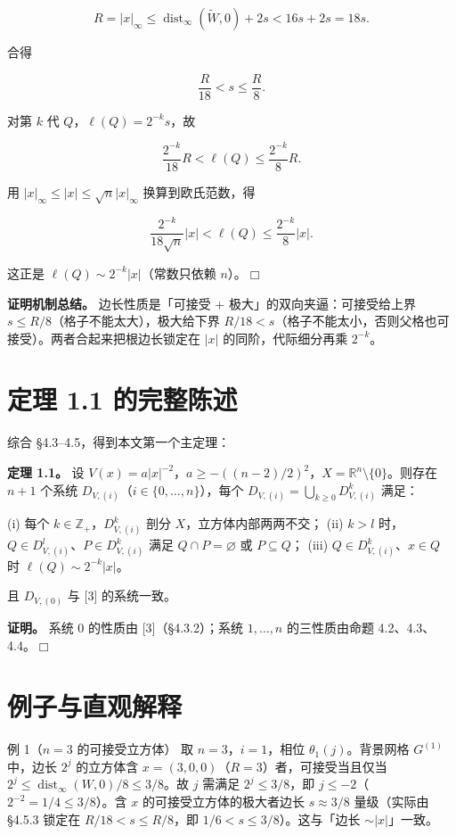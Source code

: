 \documentclass[a4paper,11pt,openany]{ctexbook}
\numberwithin{equation}{chapter}
\numberwithin{figure}{chapter}
\numberwithin{table}{chapter}
\begin{document}
$$R=|x|_\infty\le\operatorname{dist}_\infty(\widetilde W,0)+2s<16s+2s=18s.$$

合得

$$\frac R{18}<s\le\frac R8.$$

对第 $k$ 代 $Q$，$\ell(Q)=2^{-k}s$，故

$$\frac{2^{-k}}{18}R<\ell(Q)\le\frac{2^{-k}}8 R.$$

用 $|x|_\infty\le|x|\le\sqrt n|x|_\infty$ 换算到欧氏范数，得

$$\frac{2^{-k}}{18\sqrt n}|x|<\ell(Q)\le\frac{2^{-k}}8|x|.$$

这正是 $\ell(Q)\sim2^{-k}|x|$（常数只依赖 $n$）。$\Box$

\textbf{证明机制总结。} 边长性质是「可接受 + 极大」的双向夹逼：可接受给上界 $s\le R/8$（格子不能太大），极大给下界 $R/18<s$（格子不能太小，否则父格也可接受）。两者合起来把根边长锁定在 $|x|$ 的同阶，代际细分再乘 $2^{-k}$。

\section{定理 1.1 的完整陈述}

综合 §4.3–4.5，得到本文第一个主定理：

\textbf{定理 1.1。} 设 $V(x)=a|x|^{-2}$，$a\ge-((n-2)/2)^2$，$X=\mathbb R^n\setminus\{0\}$。则存在 $n+1$ 个系统 $D_{V,(i)}$（$i\in\{0,\dots,n\}$），每个 $D_{V,(i)}=\bigcup_{k\ge0}D_{V,(i)}^k$ 满足：

(i) 每个 $k\in\mathbb Z_+$，$D_{V,(i)}^k$ 剖分 $X$，立方体内部两两不交；
(ii) $k>l$ 时，$Q\in D_{V,(i)}^l$、$P\in D_{V,(i)}^k$ 满足 $Q\cap P=\varnothing$ 或 $P\subseteq Q$；
(iii) $Q\in D_{V,(i)}^k$、$x\in Q$ 时 $\ell(Q)\sim2^{-k}|x|$。

且 $D_{V,(0)}$ 与 [3] 的系统一致。

\textbf{证明。} 系统 $0$ 的性质由 [3]（§4.3.2）；系统 $1,\dots,n$ 的三性质由命题 4.2、4.3、4.4。$\Box$

\section{例子与直观解释}

\begin{examplebox}{例 1（$n=3$ 的可接受立方体）}
取 $n=3$，$i=1$，相位 $\theta_1(j)$。背景网格 $G^{(1)}$ 中，边长 $2^j$ 的立方体含 $x=(3,0,0)$（$R=3$）者，可接受当且仅当 $2^j\le\operatorname{dist}_\infty(W,0)/8\le3/8$。故 $j$ 需满足 $2^j\le3/8$，即 $j\le-2$（$2^{-2}=1/4\le3/8$）。含 $x$ 的可接受立方体的极大者边长 $s\approx3/8$ 量级（实际由 §4.5.3 锁定在 $R/18<s\le R/8$，即 $1/6<s\le3/8$）。这与「边长 $\sim|x|$」一致。
\end{examplebox}
\end{document}
